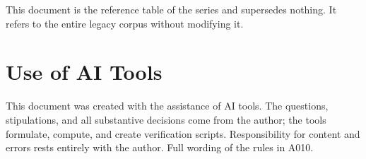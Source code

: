 This document is the reference table of the series and supersedes nothing. It
refers to the entire legacy corpus without modifying it.

\section{Use of AI Tools}

This document was created with the assistance of AI tools. The questions,
stipulations, and all substantive decisions come from the author; the tools
formulate, compute, and create verification scripts.
Responsibility for content and errors rests entirely with the author.
Full wording of the rules in A010.
